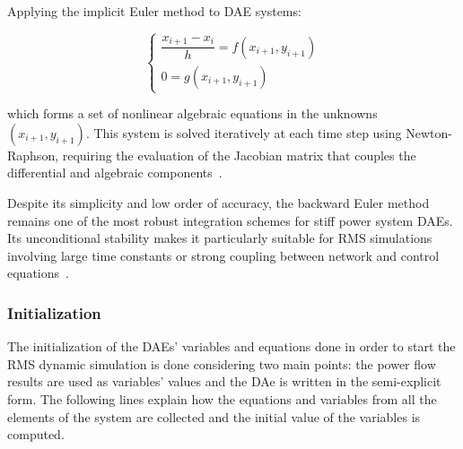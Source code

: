 Applying the implicit Euler method to DAE systems:

\begin{equation}
    \begin{cases}
        \dfrac{x_{i+1} - x_i}{h} = f(x_{i+1}, y_{i+1}) \\
        0 = g(x_{i+1}, y_{i+1})
    \end{cases}
    \label{eq:dae_implicit_step}
\end{equation}

which forms a set of nonlinear algebraic equations in the unknowns $(x_{i+1}, y_{i+1})$. This system is solved iteratively at each time step using Newton-Raphson,
requiring the evaluation of the Jacobian matrix that couples the differential and algebraic components~\cite{Hindmarsh1995}. 

Despite its simplicity and low order of accuracy, the backward Euler method remains one of the most robust integration schemes for stiff power system DAEs.
Its unconditional stability makes it particularly suitable for RMS simulations involving large time constants or strong coupling between network and control equations~\cite{LaraTDS}.


\subsubsection{Initialization}

The initialization of the DAEs' variables and equations done in order to start the RMS dynamic simulation is done considering two main points: the power flow results
are used as variables' values and the DAe is written in the semi-explicit form. The following lines explain how the equations and variables from all the elements of the 
system are collected and the initial value of the variables is computed.

